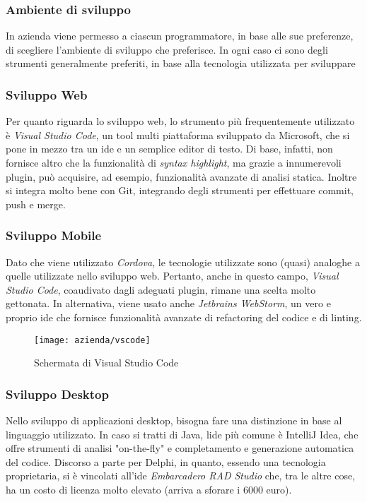 \subsubsection{Ambiente di sviluppo}
In azienda viene permesso a ciascun programmatore, in base alle sue preferenze, di scegliere l'ambiente di sviluppo che preferisce. In ogni caso ci sono degli strumenti generalmente preferiti, in base alla tecnologia utilizzata per sviluppare

\subsubsection{Sviluppo Web}
Per quanto riguarda lo sviluppo web, lo strumento più frequentemente utilizzato è \textit{Visual Studio Code}, un tool multi piattaforma sviluppato da Microsoft, che si pone in mezzo tra un \gls{ide} e un semplice editor di testo. Di base, infatti, non fornisce altro che la funzionalità di \textit{syntax highlight}, ma grazie a innumerevoli plugin, può acquisire, ad esempio, funzionalità avanzate di analisi statica. Inoltre si integra molto bene con Git, integrando degli strumenti per effettuare commit, push e merge.

\subsubsection{Sviluppo Mobile}
Dato che viene utilizzato \textit{Cordova}, le tecnologie utilizzate sono (quasi) analoghe a quelle utilizzate nello sviluppo web. Pertanto, anche in questo campo, \textit{Visual Studio Code}, coaudivato dagli adeguati plugin, rimane una scelta molto gettonata. In alternativa, viene usato anche \textit{Jetbrains WebStorm}, un vero e proprio \gls{ide} che fornisce funzionalità avanzate di refactoring del codice e di linting.

\begin{figure}[!h] 
	\centering 
	\texttt{[image: azienda/vscode]} 
	\caption{Schermata di Visual Studio Code}
\end{figure}

\subsubsection{Sviluppo Desktop}
Nello sviluppo di applicazioni desktop, bisogna fare una distinzione in base al linguaggio utilizzato. In caso si tratti di Java, l\gls{ide} più comune è IntelliJ Idea, che offre strumenti di analisi "on-the-fly" e completamento e generazione automatica del codice. Discorso a parte per Delphi, in quanto, essendo una tecnologia proprietaria, si è vincolati all'\gls{ide} \textit{Embarcadero RAD Studio} che, tra le altre cose, ha un costo di licenza molto elevato (arriva a sforare i 6000 euro).

